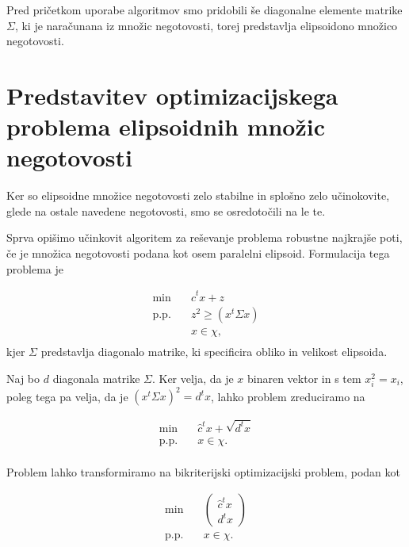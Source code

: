 \documentclass[a4paper, 12 pt]{article}
\theoremstyle{definition} %
\theoremstyle{plain} %
\theoremstyle{definition}
\begin{document}
Pred pričetkom uporabe algoritmov smo pridobili še diagonalne elemente matrike $\Sigma$, ki je naračunana iz množic negotovosti, torej predstavlja elipsoidono množico negotovosti.


\section{Predstavitev optimizacijskega problema elipsoidnih množic negotovosti}
Ker so elipsoidne množice negotovosti zelo stabilne in splošno zelo učinokovite, glede na ostale navedene negotovosti, smo se osredotočili na le te.

Sprva opišimo učinkovit algoritem za reševanje problema robustne najkrajše poti, če je množica negotovosti podana kot osem paralelni elipsoid. Formulacija tega problema je

\begin{equation*}
\begin{aligned}
\min \quad &  \hat{c}^t x + z\\
\textrm{p.p.} \quad & {z}^2 \geq (x^t \Sigma x )\\
& x \in \chi,\\
\end{aligned}
\end{equation*}
 kjer $\Sigma$ predstavlja diagonalo matrike, ki specificira obliko in velikost elipsoida. \newline

Naj bo $d$ diagonala matrike $\Sigma$.
Ker velja, da je $x$ binaren vektor in s tem $x_{i}^2=x_{i}$, poleg tega pa velja, da je $(x^t  \Sigma x)^2 = d^tx$, lahko problem zreduciramo na

\begin{equation*}
\begin{aligned}
\min \quad &  \hat{c}^t x +\sqrt{d^tx}\\
\textrm{p.p.} \quad & x \in \chi.\\
\end{aligned}
\end{equation*}

Problem lahko transformiramo na bikriterijski optimizacijski problem, podan kot

\begin{equation*}
\begin{aligned}
\min \quad &  \begin{pmatrix} \hat{c}^t x \\ d^tx \end{pmatrix} \\
\textrm{p.p.} \quad & x \in \chi.\\
\end{aligned}
\end{equation*}
\end{document}
